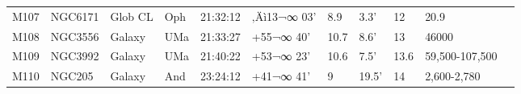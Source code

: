 \documentclass[10pt,twoside,a4paper,english]{report}
\begin{document}
\begin{longtable}{@{}lllllllllll@{}}
M107       & NGC6171     & Glob CL    & Oph       & 21:32:12 & ‚Äì13¬∞ 03'  & 8.9       & 3.3'                 & 12       & 20.9                &                                           \\ 
M108       & NGC3556     & Galaxy     & UMa       & 21:33:27 & +55¬∞ 40'  & 10.7      & 8.6'                 & 13       & 46000               &                                           \\ 
M109       & NGC3992     & Galaxy     & UMa       & 21:40:22 & +53¬∞ 23'  & 10.6      & 7.5'                 & 13.6     & 59,500-107,500      &                                           \\ 
M110       & NGC205      & Galaxy     & And       & 23:24:12 & +41¬∞ 41'  & 9         & 19.5'                & 14       & 2,600-2,780         &                                           \\ 
\hline 
\end{longtable} 
 
 
 
 
 
 
 
\newpage 
\noindent 
 
\end{document}
